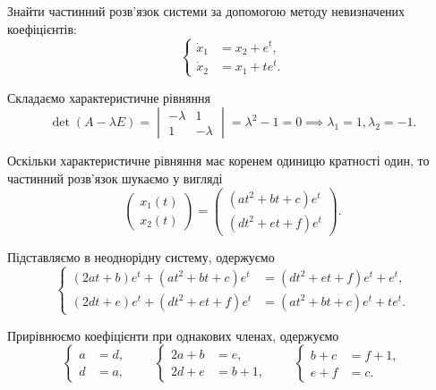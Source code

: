 \begin{example}
	Знайти частинний розв'язок системи за допомогою методу невизначених коефіцієнтів:
	\begin{equation*}
		\left\{
			\begin{aligned}
				\dot x_1 &= x_2 + e^t, \\
				\dot x_2 &= x_1 + t e^t.
			\end{aligned}
		\right.
	\end{equation*}
\end{example}

\begin{solution}
	Складаємо характеристичне рівняння
	\begin{equation*}
		\det (A - \lambda E) = \begin{vmatrix} - \lambda & 1 \\ 1 & - \lambda \end{vmatrix} = \lambda^2 - 1 = 0 \implies \lambda_1 = 1, \lambda_2 = -1.
	\end{equation*}

	Оскільки характеристичне рівняння має коренем одиницю кратності \allowbreak один, то частинний роз\-в'я\-зок шукаємо у вигляді
	\begin{equation*}
		\begin{pmatrix} x_1(t) \\ x_2(t) \end{pmatrix} = \begin{pmatrix} (a t^2 + b t + c) e^t \\ (d t^2 + e t + f) e^t \end{pmatrix}.
	\end{equation*}

	Підставляємо в неоднорідну систему, одержуємо
	\begin{equation*}
		\left\{
			\begin{aligned}
				(2 a t + b) e^t + (a t^2 + b t + c) e^t &= (d t^2 + e t + f) e^t + e^t, \\
				(2 d t + e) e^t + (d t^2 + e t + f) e^t &= (a t^2 + b t + c) e^t + t e^t.
			\end{aligned}
		\right.
	\end{equation*}

	Прирівнюємо коефіцієнти при однакових членах, одержуємо
	\begin{equation*}
		\left\{
			\begin{aligned}
				a &= d, \\
				d &= a,
			\end{aligned}
		\right. \qquad \left\{
			\begin{aligned}
				2 a + b &= e, \\
				2 d + e &= b + 1,
			\end{aligned}
		\right. \qquad \left\{
			\begin{aligned}
				b + c &= f + 1, \\
				e + f &= c.
			\end{aligned}
		\right.
	\end{equation*}


\end{solution}
